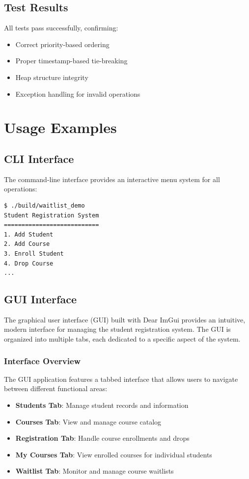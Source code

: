 \documentclass[12pt,a4paper]{article}
\begin{document}
\subsection{Test Results}
All tests pass successfully, confirming:
\begin{itemize}
    \item Correct priority-based ordering
    \item Proper timestamp-based tie-breaking
    \item Heap structure integrity
    \item Exception handling for invalid operations
\end{itemize}

\section{Usage Examples}

\subsection{CLI Interface}
The command-line interface provides an interactive menu system for all operations:

\begin{lstlisting}[caption=Example CLI Session, language=bash]
$ ./build/waitlist_demo
Student Registration System
===========================
1. Add Student
2. Add Course
3. Enroll Student
4. Drop Course
...
\end{lstlisting}

\subsection{GUI Interface}

The graphical user interface (GUI) built with Dear ImGui provides an intuitive, modern interface for managing the student registration system. The GUI is organized into multiple tabs, each dedicated to a specific aspect of the system.

\subsubsection{Interface Overview}

The GUI application features a tabbed interface that allows users to navigate between different functional areas:

\begin{itemize}
    \item \textbf{Students Tab}: Manage student records and information
    \item \textbf{Courses Tab}: View and manage course catalog
    \item \textbf{Registration Tab}: Handle course enrollments and drops
    \item \textbf{My Courses Tab}: View enrolled courses for individual students
    \item \textbf{Waitlist Tab}: Monitor and manage course waitlists
\end{itemize}
\end{document}
